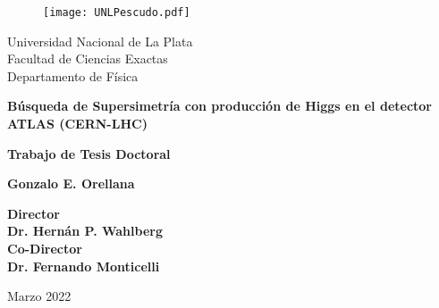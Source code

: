


\thispagestyle{empty}
\begin{center}

\begin{figure}[h]
\centering
\texttt{[image: UNLPescudo.pdf]}
\end{figure}

{\normalsize Universidad Nacional de La Plata\\}
{\normalsize Facultad de Ciencias Exactas\\}
{\normalsize Departamento de Física\\}


\vspace{2cm}

\hrulefill

{\bf \LARGE  Búsqueda de Supersimetría con producción de Higgs en el detector ATLAS (CERN-LHC)\\}

\vspace{0.6cm}

\hrulefill

\vspace{0.3cm}

{\normalsize \bf Trabajo de Tesis Doctoral \\}

\vspace{2.5cm}

{\Large \bf Gonzalo E. Orellana \\}

\vspace{3.5cm}

{\large\bf Director \\}
{\large\bf Dr. Hernán P. Wahlberg \\}
{\large\bf Co-Director \\}
{\large\bf Dr. Fernando Monticelli \\}

\vspace{2cm}

{\normalsize Marzo 2022}

\end{center}



\restoregeometry



